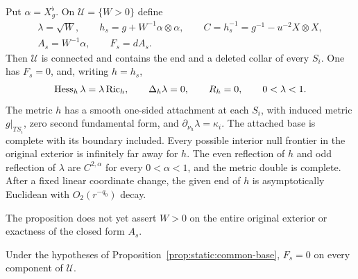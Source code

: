 \begin{proposition}
Put $\alpha=X_g^\flat$.  On $\mathcal U=\{W>0\}$ define
\begin{equation}\label{eq:static:orbit-metric}
 \begin{gathered}
 \lambda=\sqrt W,\qquad
 h_s=g+W^{-1}\alpha\otimes\alpha,\qquad
 C=h_s^{-1}=g^{-1}-u^{-2}X\otimes X,\\
 A_s=W^{-1}\alpha,\qquad F_s=dA_s.
 \end{gathered}
\end{equation}
Then $\mathcal U$ is connected and contains the end and a deleted
collar of every $S_i$.  One has $F_s=0$, and, writing $h=h_s$,
\begin{equation}\label{eq:static:common-equations}
 \operatorname{Hess}_h\lambda=\lambda\operatorname{Ric}_h,\qquad
 \Delta_h\lambda=0,\qquad R_h=0,\qquad 0<\lambda<1.
\end{equation}
The metric $h$ has a smooth one-sided attachment at each $S_i$,
with induced metric $g|_{TS_i}$, zero second fundamental form,
and $\partial_{\nu_h}\lambda=\kappa_i$.  The attached base is
complete with its boundary included.  Every possible interior null
frontier in the original exterior is infinitely far away for $h$.
The even reflection of $h$ and odd reflection of $\lambda$ are
$C^{2,\alpha}$ for every $0<\alpha<1$, and the metric double is
complete.  After a fixed linear coordinate change, the given end
of $h$ is asymptotically Euclidean with $O_2(r^{-q_0})$ decay.
\end{proposition}

The proposition does not yet assert $W>0$ on the entire original
exterior or exactness of the closed form $A_s$.

\begin{lemma}\label{lem:static:twist}
Under the hypotheses of Proposition~\ref{prop:static:common-base},
$F_s=0$ on every component of $\mathcal U$.
\end{lemma}

